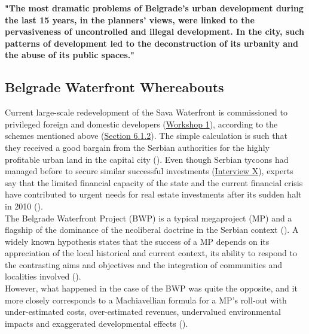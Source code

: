 \documentclass[11pt]{report}
\begin{document}
{{{{\textbf{"The most dramatic problems of Belgrade’s urban development during the last 15 years, in the planners’ views, were linked to the pervasiveness of uncontrolled and illegal development. In the city, such patterns of development led to the deconstruction of its urbanity and the abuse of its public spaces."} \href{Vujovic}{\cite{vujovic_belgrades_2007}}

\subsection{Belgrade Waterfront Whereabouts}

Current large-scale redevelopment of the Sava Waterfront is commissioned to privileged foreign and domestic developers
(\href{Expert Workshop}{Workshop 1}),
according to the schemes mentioned above (\href{Section 6.1.2}{Section 6.1.2}).
The simple calculation is such that they received a good bargain from the Serbian authorities for the highly profitable urban land in the capital city (\href{Politika}{\citealt{politika_zemljiste_2015}}).
Even though Serbian tycoons had managed before to secure similar successful investments (\href{InterviewX}{Interview X}),
experts say that the limited financial capacity of the state and  the  current  financial  crisis  have  contributed  to urgent needs for real estate investments after its sudden halt in 2010 (\href{ref}{\citealt{doytchinov_urban_2015}}).
\\

The Belgrade Waterfront Project (BWP) is a typical megaproject (MP) and a flagship of the dominance of the neoliberal doctrine in the Serbian context  (\href{ref}{\citealt{harvey_rebel_2012}}).
A widely known hypothesis states that the success of a MP depends on its appreciation of the local historical and current context, its ability to respond to the contrasting aims and objectives and the integration of communities and localities involved (\href{ref}{\citealt{hoyle_global_2000}}).
\\

However, what happened in the case of the BWP was quite the opposite, and it more closely corresponds to a Machiavellian formula for a MP’s roll-out with under-estimated costs, over-estimated revenues, undervalued environmental impacts and exaggerated developmental effects  (\href{ref}{\citealt{flyvbjerg_megaprojects_2003}}).
\\

}}}}
\end{document}

